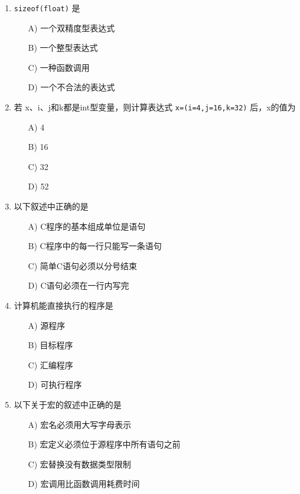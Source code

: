 \documentclass[a4paper,12pt]{article}
\begin{document}
\begin{enumerate}
	\item \texttt{sizeof(float)} 是
	      \begin{enumerate}
		      \item[A)] 一个双精度型表达式
		      \item[B)] 一个整型表达式
		      \item[C)] 一种函数调用
		      \item[D)] 一个不合法的表达式
	      \end{enumerate}
	      \vspace{0.3cm}

	\item 若 x、i、j和k都是int型变量，则计算表达式 \texttt{x=(i=4,j=16,k=32)} 后，x的值为
	      \begin{enumerate}
		      \item[A)] 4
		      \item[B)] 16
		      \item[C)] 32
		      \item[D)] 52
	      \end{enumerate}
	      \vspace{0.3cm}

	\item 以下叙述中正确的是
	      \begin{enumerate}
		      \item[A)] C程序的基本组成单位是语句
		      \item[B)] C程序中的每一行只能写一条语句
		      \item[C)] 简单C语句必须以分号结束
		      \item[D)] C语句必须在一行内写完
	      \end{enumerate}
	      \vspace{0.3cm}

	\item 计算机能直接执行的程序是
	      \begin{enumerate}
		      \item[A)] 源程序
		      \item[B)] 目标程序
		      \item[C)] 汇编程序
		      \item[D)] 可执行程序
	      \end{enumerate}
	      \vspace{0.3cm}

	\item 以下关于宏的叙述中正确的是
	      \begin{enumerate}
		      \item[A)] 宏名必须用大写字母表示
		      \item[B)] 宏定义必须位于源程序中所有语句之前
		      \item[C)] 宏替换没有数据类型限制
		      \item[D)] 宏调用比函数调用耗费时间
	      \end{enumerate}
	      \vspace{0.3cm}


\end{enumerate}
\end{document}
